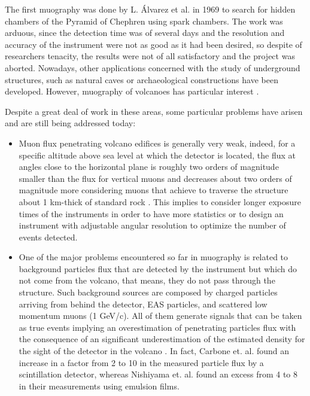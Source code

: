 \documentclass[letterpaper,11pt]{article}
\begin{document}
The first muography was done by L. \'Alvarez et al. \cite{burkhard1970search} in 1969 to search for hidden chambers of the Pyramid of Chephren using spark chambers. The work was arduous, since the detection time was of several days and the resolution and accuracy of the instrument were not as good as it had been desired, so despite of researchers tenacity, the results were not of all satisfactory and the project was aborted. Nowadays, other applications concerned with the study of underground structures, such as natural caves \cite{caffau1997underground} or archaeological constructions \cite{basset2006mgr,menichelli2007scintillating} have been developed. However, muography of volcanoes has particular interest \cite{tanaka2013subsurface,saracino2012looking,marteau2012muons,okubo2012imaging,lesparre2010geophysical,tanaka2007high}.

Despite a great deal of work in these areas, some particular problems have arisen and are still being addressed today:
\begin{itemize}

\item Muon flux penetrating volcano edifices is generally very weak, indeed, for a specific altitude above sea level at which the detector is located, the flux at angles close to the horizontal plane is roughly two orders of magnitude smaller than the flux for vertical muons and decreases about two orders of magnitude more considering muons that achieve to traverse the structure about 1 km-thick of standard rock \cite{groom2001muon, groom2000passage}. This implies to consider longer exposure times of the instruments in order to have more statistics or to design an instrument with adjustable angular resolution to optimize the number of events detected.

\item One of the major problems encountered so far in muography is related to background particles flux that are detected by the instrument but which do not come from the volcano, that means, they do not pass through the structure. Such background sources are composed by charged particles arriving from behind the detector, EAS particles, and scattered low momentum muons (1 GeV/c). All of them generate signals that can be taken as true events implying an overestimation of penetrating particles flux with the consequence of an significant underestimation of the estimated density for the sight of the detector in the volcano \cite{carbone2013experiment, jourde2013experimental, nishiyama2014experimental, nishiyama2016monte, ambrosino2015joint}. In fact, Carbone et. al. \cite{carbone2013experiment} found an increase in a factor from 2 to 10 in the measured particle flux by a scintillation detector, whereas Nishiyama et. al. \cite{nishiyama2016monte} found an excess from 4 to 8 in their measurements using emulsion films.
\end{itemize}
\end{document}
